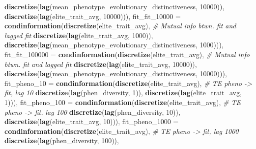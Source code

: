 \documentclass[]{book}
\newenvironment{Shaded}{\begin{snugshade}}{\end{snugshade}}
\newcommand{\CommentTok}[1]{\textcolor[rgb]{0.56,0.35,0.01}{\textit{#1}}}
\newcommand{\DataTypeTok}[1]{\textcolor[rgb]{0.13,0.29,0.53}{#1}}
\newcommand{\DecValTok}[1]{\textcolor[rgb]{0.00,0.00,0.81}{#1}}
\newcommand{\KeywordTok}[1]{\textcolor[rgb]{0.13,0.29,0.53}{\textbf{#1}}}
\newcommand{\NormalTok}[1]{#1}
\begin{document}
\begin{Shaded}
\begin{Highlighting}[]
{                                     \KeywordTok{discretize}\NormalTok{(}\KeywordTok{lag}\NormalTok{(mean_phenotype_evolutionary_distinctiveness, }\DecValTok{10000}\NormalTok{)), }
                                     \KeywordTok{discretize}\NormalTok{(}\KeywordTok{lag}\NormalTok{(elite_trait_avg, }\DecValTok{10000}\NormalTok{))),  }
  \DataTypeTok{fit_fit_10000 =}    \KeywordTok{condinformation}\NormalTok{(}\KeywordTok{discretize}\NormalTok{(elite_trait_avg), }\CommentTok{# Mutual info btwn. fit and lagged fit}
                                     \KeywordTok{discretize}\NormalTok{(}\KeywordTok{lag}\NormalTok{(elite_trait_avg, }\DecValTok{1000}\NormalTok{)), }
                                     \KeywordTok{discretize}\NormalTok{(}\KeywordTok{lag}\NormalTok{(mean_phenotype_evolutionary_distinctiveness, }\DecValTok{1000}\NormalTok{))),}
  \DataTypeTok{fit_fit_100000 =}   \KeywordTok{condinformation}\NormalTok{(}\KeywordTok{discretize}\NormalTok{(elite_trait_avg), }\CommentTok{# Mutual info btwn. fit and lagged fit}
                                     \KeywordTok{discretize}\NormalTok{(}\KeywordTok{lag}\NormalTok{(elite_trait_avg, }\DecValTok{10000}\NormalTok{)), }
                                     \KeywordTok{discretize}\NormalTok{(}\KeywordTok{lag}\NormalTok{(mean_phenotype_evolutionary_distinctiveness, }\DecValTok{10000}\NormalTok{))),  }
  \DataTypeTok{fit_pheno_10 =}     \KeywordTok{condinformation}\NormalTok{(}\KeywordTok{discretize}\NormalTok{(elite_trait_avg), }\CommentTok{# TE pheno -> fit, lag 10}
                                     \KeywordTok{discretize}\NormalTok{(}\KeywordTok{lag}\NormalTok{(phen_diversity, }\DecValTok{1}\NormalTok{)), }
                                     \KeywordTok{discretize}\NormalTok{(}\KeywordTok{lag}\NormalTok{(elite_trait_avg, }\DecValTok{1}\NormalTok{))),}
  \DataTypeTok{fit_pheno_100 =}    \KeywordTok{condinformation}\NormalTok{(}\KeywordTok{discretize}\NormalTok{(elite_trait_avg),  }\CommentTok{# TE pheno -> fit, lag 100 }
                                     \KeywordTok{discretize}\NormalTok{(}\KeywordTok{lag}\NormalTok{(phen_diversity, }\DecValTok{10}\NormalTok{)), }
                                     \KeywordTok{discretize}\NormalTok{(}\KeywordTok{lag}\NormalTok{(elite_trait_avg, }\DecValTok{10}\NormalTok{))),}
  \DataTypeTok{fit_pheno_1000 =}   \KeywordTok{condinformation}\NormalTok{(}\KeywordTok{discretize}\NormalTok{(elite_trait_avg),  }\CommentTok{# TE pheno -> fit, lag 1000}
                                     \KeywordTok{discretize}\NormalTok{(}\KeywordTok{lag}\NormalTok{(phen_diversity, }\DecValTok{100}\NormalTok{)), }
}
\end{Highlighting}
\end{Shaded}
\end{document}
